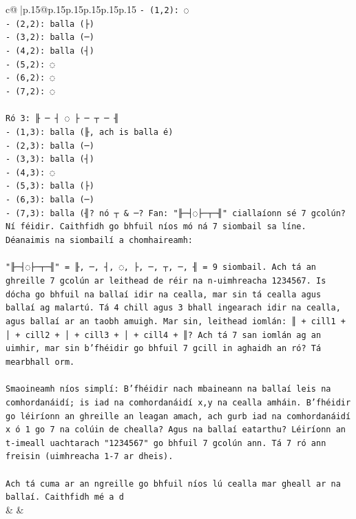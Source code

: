 \documentclass{article}
\begin{document}
{\begin{supertabular}{c@{$\;$}|p{.15\linewidth}@{}p{.15\linewidth}p{.15\linewidth}p{.15\linewidth}p{.15\linewidth}p{.15\linewidth}}
{{{\texttt{{-} (1,2): ◌} \\
\texttt{{-} (2,2): balla (├)} \\
\texttt{{-} (3,2): balla (─)} \\
\texttt{{-} (4,2): balla (┤)} \\
\texttt{{-} (5,2): ◌} \\
\texttt{{-} (6,2): ◌} \\
\texttt{{-} (7,2): ◌} \\
\\ 
\texttt{Ró 3: ╟ ─ ┤ ◌ ├ ─ ┬ ─ ╢} \\
\texttt{{-} (1,3): balla (╟, ach is balla é)} \\
\texttt{{-} (2,3): balla (─)} \\
\texttt{{-} (3,3): balla (┤)} \\
\texttt{{-} (4,3): ◌} \\
\texttt{{-} (5,3): balla (├)} \\
\texttt{{-} (6,3): balla (─)} \\
\texttt{{-} (7,3): balla (╢? nó ┬ \& ─? Fan: "╟─┤◌├─┬─╢" ciallaíonn sé 7 gcolún? Ní féidir. Caithfidh go bhfuil níos mó ná 7 siombail sa líne. Déanaimis na siombailí a chomhaireamh:} \\
\\ 
\texttt{"╟─┤◌├─┬─╢" = ╟, ─, ┤, ◌, ├, ─, ┬, ─, ╢ = 9 siombail. Ach tá an ghreille 7 gcolún ar leithead de réir na n{-}uimhreacha 1234567. Is dócha go bhfuil na ballaí idir na cealla, mar sin tá cealla agus ballaí ag malartú. Tá 4 chill agus 3 bhall ingearach idir na cealla, agus ballaí ar an taobh amuigh. Mar sin, leithead iomlán: ║ + cill1 + │ + cill2 + │ + cill3 + │ + cill4 + ║? Ach tá 7 san iomlán ag an uimhir, mar sin b'fhéidir go bhfuil 7 gcill in aghaidh an ró? Tá mearbhall orm.} \\
\\ 
\texttt{Smaoineamh níos simplí: B'fhéidir nach mbaineann na ballaí leis na comhordanáidí; is iad na comhordanáidí x,y na cealla amháin. B'fhéidir go léiríonn an ghreille an leagan amach, ach gurb iad na comhordanáidí x ó 1 go 7 na colúin de chealla? Agus na ballaí eatarthu? Léiríonn an t{-}imeall uachtarach "1234567" go bhfuil 7 gcolún ann. Tá 7 ró ann freisin (uimhreacha 1{-}7 ar dheis).} \\
\\ 
\texttt{Ach tá cuma ar an ngreille go bhfuil níos lú cealla mar gheall ar na ballaí. Caithfidh mé a d} \\
            }
        }
    }
    & & \\ \\


\end{supertabular}}
\end{document}
